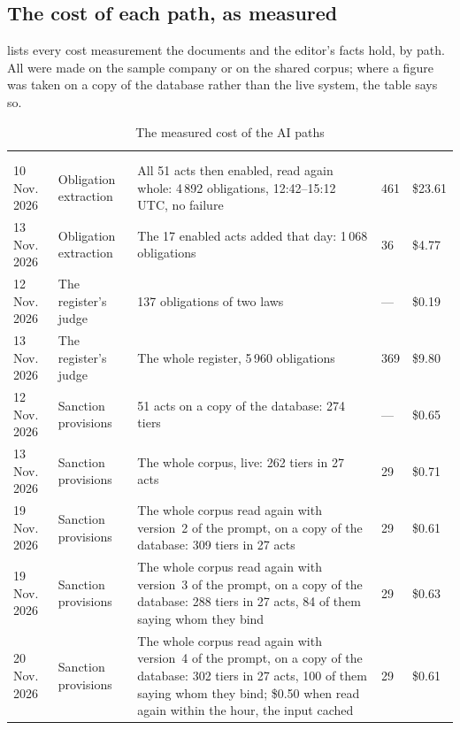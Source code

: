 \subsection{The cost of each path, as measured}

 lists every cost measurement the documents and the editor's facts
hold, by path. All were made on the sample company or on the shared corpus; where a figure was
taken on a copy of the database rather than the live system, the table says so.

\begin{xltabular}{\textwidth}{@{}L{17mm}L{35mm}YR{12mm}R{15mm}@{}}
\caption{The measured cost of the AI paths}\label{tab:control:costs}\\
\toprule
{} &  &  &  &  \\
\midrule
\endfirsthead
\toprule
{} &  &  &  &  \\
\midrule
\endhead
\bottomrule
\endlastfoot
{} \\
10 Nov. 2026 & Obligation extraction & All 51 acts then enabled, read again whole: 4\,892 obligations, 12:42--15:12 UTC, no failure & 461 & \$23.61 \\
13 Nov. 2026 & Obligation extraction & The 17 enabled acts added that day: 1\,068 obligations & 36 & \$4.77 \\
12 Nov. 2026 & The register's judge & 137 obligations of two laws & --- & \$0.19 \\
13 Nov. 2026 & The register's judge & The whole register, 5\,960 obligations & 369 & \$9.80 \\
12 Nov. 2026 & Sanction provisions & 51 acts on a copy of the database: 274 tiers & --- & \$0.65 \\
13 Nov. 2026 & Sanction provisions & The whole corpus, live: 262 tiers in 27 acts & 29 & \$0.71 \\
19 Nov. 2026 & Sanction provisions & The whole corpus read again with version~2 of the prompt, on a copy of the database: 309 tiers in 27 acts & 29 & \$0.61 \\
19 Nov. 2026 & Sanction provisions & The whole corpus read again with version~3 of the prompt, on a copy of the database: 288 tiers in 27 acts, 84 of them saying whom they bind & 29 & \$0.63 \\
20 Nov. 2026 & Sanction provisions & The whole corpus read again with version~4 of the prompt, on a copy of the database: 302 tiers in 27 acts, 100 of them saying whom they bind; \$0.50 when read again within the hour, the input cached & 29 & \$0.61 \\

\end{xltabular}

